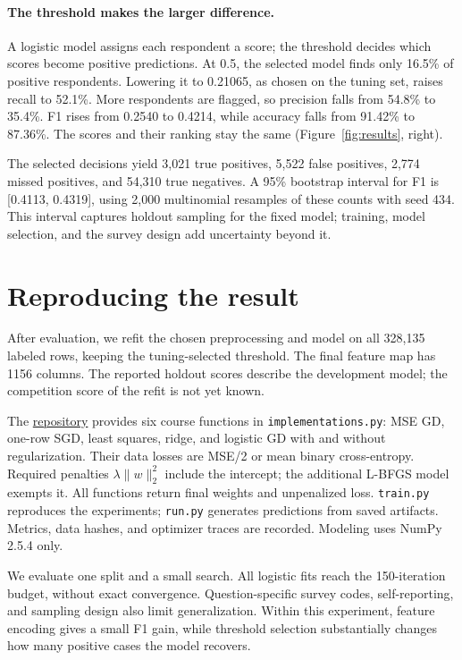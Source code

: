 \documentclass[10pt,a4paper]{article}
\begin{document}
\paragraph{The threshold makes the larger difference.}
A logistic model assigns each respondent a score; the threshold decides which scores become positive predictions. At 0.5, the selected model finds only 16.5\% of positive respondents. Lowering it to 0.21065, as chosen on the tuning set, raises recall to 52.1\%. More respondents are flagged, so precision falls from 54.8\% to 35.4\%. F1 rises from 0.2540 to 0.4214, while accuracy falls from 91.42\% to 87.36\%. The scores and their ranking stay the same (Figure~\ref{fig:results}, right).

The selected decisions yield 3,021 true positives, 5,522 false positives, 2,774 missed positives, and 54,310 true negatives. A 95\% bootstrap interval for F1 is [0.4113, 0.4319], using 2,000 multinomial resamples of these counts with seed 434. This interval captures holdout sampling for the fixed model; training, model selection, and the survey design add uncertainty beyond it.

\section{Reproducing the result}
After evaluation, we refit the chosen preprocessing and model on all 328,135 labeled rows, keeping the tuning-selected threshold. The final feature map has 1156 columns. The reported holdout scores describe the development model; the competition score of the refit is not yet known.

The \href{https://github.com/MisakiTaro0414/epfl-ml-project1-2026}{repository} provides six course functions in \texttt{implementations.py}: MSE GD, one-row SGD, least squares, ridge, and logistic GD with and without regularization. Their data losses are MSE/2 or mean binary cross-entropy. Required penalties $\lambda\|w\|_2^2$ include the intercept; the additional L-BFGS model exempts it. All functions return final weights and unpenalized loss. \texttt{train.py} reproduces the experiments; \texttt{run.py} generates predictions from saved artifacts. Metrics, data hashes, and optimizer traces are recorded. Modeling uses NumPy 2.5.4 only.

We evaluate one split and a small search. All logistic fits reach the 150-iteration budget, without exact convergence. Question-specific survey codes, self-reporting, and sampling design also limit generalization. Within this experiment, feature encoding gives a small F1 gain, while threshold selection substantially changes how many positive cases the model recovers.
\end{document}
